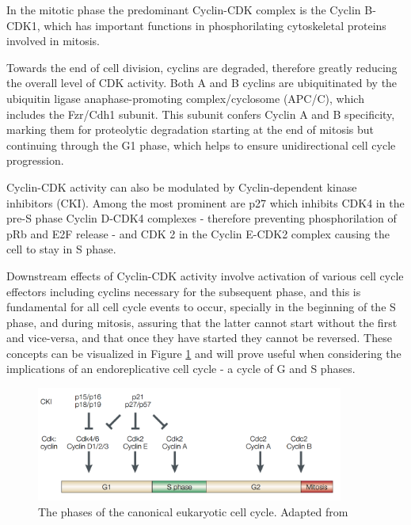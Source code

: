 \documentclass[11pt,twoside,a4paper]{report}
\begin{document}
				In the mitotic phase the predominant Cyclin-CDK complex is the Cyclin B-CDK1, which has important functions in phosphorilating cytoskeletal proteins involved in mitosis.
				
				Towards the end of cell division, cyclins are degraded, therefore greatly reducing the overall level of CDK activity. Both A and B cyclins are ubiquitinated by the ubiquitin ligase anaphase-promoting complex/cyclosome (APC/C), which includes the Fzr/Cdh1 subunit. This subunit confers Cyclin A and B specificity, marking them for proteolytic degradation starting at the end of mitosis but continuing through the G1 phase, which helps to ensure unidirectional cell cycle progression.	
				
				Cyclin-CDK activity can also be modulated by Cyclin-dependent kinase inhibitors (CKI). Among the most prominent are p27 which inhibits CDK4 in the pre-S phase Cyclin D-CDK4 complexes - therefore preventing phosphorilation of pRb and E2F release - and CDK 2 in the Cyclin E-CDK2 complex causing the cell to stay in S phase.
				
				Downstream effects of Cyclin-CDK activity involve activation of various cell cycle effectors including cyclins necessary for the subsequent phase, and this is fundamental for all cell cycle events to occur, specially in the beginning of the S phase, and during mitosis, assuring that the latter cannot start without the first and vice-versa, and that once they have started they cannot be reversed. These concepts can be visualized in Figure \ref{fig:canonical_cycle} and will prove useful when considering the implications of an endoreplicative cell cycle - a cycle of G and S phases.
				
				\begin{figure}[here]
					\centering
					\includegraphics[width=0.9\textwidth]{pngs/canonical_cell_cycle.png}
					\caption[The phases of the canonical eukaryotic cell cycle]
					{The phases of the canonical eukaryotic cell cycle. {\footnotesize Adapted from \cite{Trimarchi2002}}}
					\label{fig:canonical_cycle}
				\end{figure}
\end{document}
